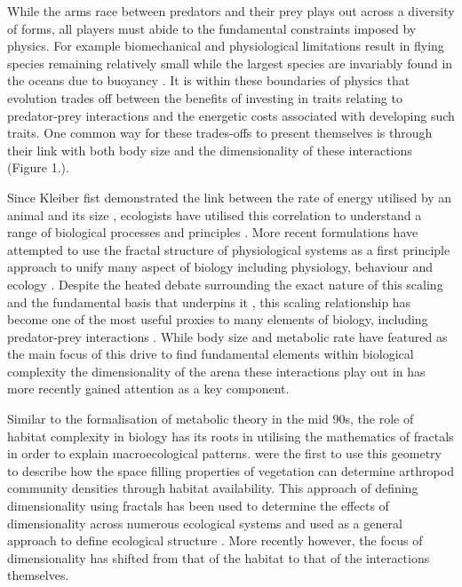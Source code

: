 While the arms race between predators and their prey plays out across a diversity of forms, all players must abide to the fundamental constraints imposed by physics. For example biomechanical and physiological limitations result in flying species remaining relatively small \citep{chatterjee2007aerodynamics,dudley2002mechanisms} while the largest species are invariably found in the oceans due to buoyancy \citep{heim2015cope}. It is within these boundaries of physics that evolution trades off between the benefits of investing in traits relating to predator-prey interactions and the energetic costs associated with developing such traits. One common way for these trades-offs to present themselves is through their link with both body size and the dimensionality of these interactions (Figure 1.).

Since Kleiber fist demonstrated the link between the rate of energy utilised by an animal and its size \citep{kleiber1947body}, ecologists have utilised this correlation to understand a range of biological processes and principles \citep{sibly2012metabolic,west1997general,brown2004}. More recent formulations have attempted to use the fractal structure of physiological systems as a first principle approach to unify many aspect of biology including physiology, behaviour and ecology \citep{west1997general,brown2004}. Despite the heated debate surrounding the exact nature of this scaling and the fundamental basis that underpins it \citep{isaac2010metabolic}, this scaling relationship has become one of the most useful proxies to many elements of biology, including predator-prey interactions \citep{brown2004}. While body size and metabolic rate have featured as the main focus of this drive to find fundamental elements within biological complexity the dimensionality of the arena these interactions play out in has more recently gained attention as a key component.


Similar to the formalisation of metabolic theory in the mid 90s, the role of habitat complexity in biology has its roots in utilising the mathematics of fractals in order to explain macroecological patterns. \cite{morse1985fractal} were the first to use this geometry to describe how the space filling properties of vegetation can determine arthropod community densities through habitat availability. This approach of defining dimensionality using fractals has been used to determine the effects of dimensionality across numerous ecological systems \citep{kenkel1996fractals,shorrocks1991fractal,gunnarsson1992fractal,gee1994body,jeffries1993invertebrate} and used as a general approach to define ecological structure \citep{cohen1995marine,henderson2010linking}. More recently however, the focus of dimensionality has shifted from that of the habitat to that of the interactions themselves.


